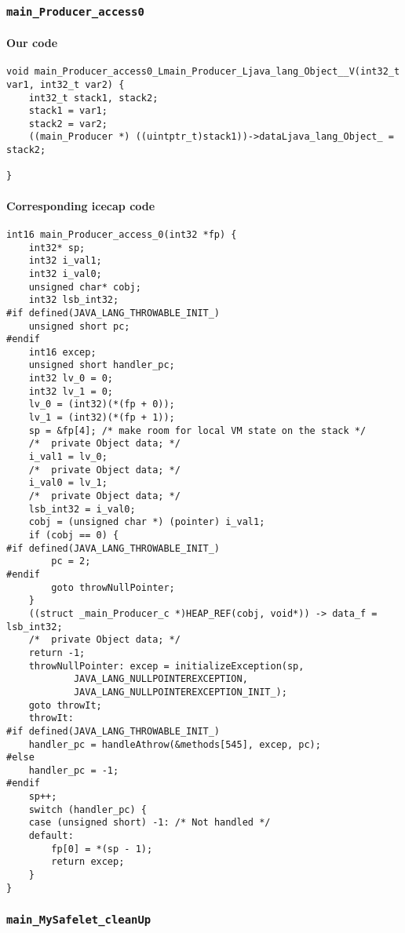 \subsubsection{\texttt{main\_Producer\_access0}}

\paragraph{Our code}\hfill
\begin{lstlisting}[firstnumber=603]
void main_Producer_access0_Lmain_Producer_Ljava_lang_Object__V(int32_t var1, int32_t var2) {
	int32_t stack1, stack2;
	stack1 = var1;
	stack2 = var2;
	((main_Producer *) ((uintptr_t)stack1))->dataLjava_lang_Object_ = stack2;

}
\end{lstlisting}

\paragraph{Corresponding icecap code}\hfill
\begin{lstlisting}[firstnumber=56853]
int16 main_Producer_access_0(int32 *fp) {
	int32* sp;
	int32 i_val1;
	int32 i_val0;
	unsigned char* cobj;
	int32 lsb_int32;
#if defined(JAVA_LANG_THROWABLE_INIT_)
	unsigned short pc;
#endif
	int16 excep;
	unsigned short handler_pc;
	int32 lv_0 = 0;
	int32 lv_1 = 0;
	lv_0 = (int32)(*(fp + 0));
	lv_1 = (int32)(*(fp + 1));
	sp = &fp[4]; /* make room for local VM state on the stack */
	/*	private Object data; */
	i_val1 = lv_0;
	/*	private Object data; */
	i_val0 = lv_1;
	/*	private Object data; */
	lsb_int32 = i_val0;
	cobj = (unsigned char *) (pointer) i_val1;
	if (cobj == 0) {
#if defined(JAVA_LANG_THROWABLE_INIT_)
		pc = 2;
#endif
		goto throwNullPointer;
	}
	((struct _main_Producer_c *)HEAP_REF(cobj, void*)) -> data_f = lsb_int32;
	/*	private Object data; */
	return -1;
	throwNullPointer: excep = initializeException(sp,
			JAVA_LANG_NULLPOINTEREXCEPTION,
			JAVA_LANG_NULLPOINTEREXCEPTION_INIT_);
	goto throwIt;
	throwIt:
#if defined(JAVA_LANG_THROWABLE_INIT_)
	handler_pc = handleAthrow(&methods[545], excep, pc);
#else
	handler_pc = -1;
#endif
	sp++;
	switch (handler_pc) {
	case (unsigned short) -1: /* Not handled */
	default:
		fp[0] = *(sp - 1);
		return excep;
	}
}
\end{lstlisting}

\subsubsection{\texttt{main\_MySafelet\_cleanUp}}

